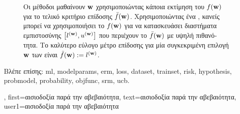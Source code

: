 {{\begin{figure}[H]
\begin{center}
{
\caption{\foreignlanguage{greek}{Οι μέθοδοι}  \foreignlanguage{greek}{μαθαίνουν}  ${\bf w}$ 
	\foreignlanguage{greek}{χρησιμοποιώντας κάποια εκτίμηση του $f({\bf w})$ για το τελικό κριτήριο
	επίδοσης $\bar{f}({\bf w})$. Χρησιμοποιώντας ένα} , \foreignlanguage{greek}{κανείς μπορεί να 
	χρησιμοποιήσει το $f({\bf w})$ για να κατασκευάσει διαστήματα εμπιστοσύνης 
	$\big[ l^{({\bf w})},  u^{({\bf w})} \big]$ που περιέχουν το $\bar{f}({\bf w})$  
	με υψηλή πιθανότητα. Το καλύτερο εύλογο μέτρο επίδοσης για μία συγκεκριμένη επιλογή ${\bf w}$ των}  
	\foreignlanguage{greek}{είναι} $\tilde{f}({\bf w}) := l^{({\bf w})}$.} }
	\end{center}
		\end{figure}
	\foreignlanguage{greek}{Βλέπε επίσης:} \gls{ml}, \gls{modelparams}, \gls{erm}, \gls{loss}, \gls{dataset}, \gls{trainset}, \gls{risk}, \gls{hypothesis}, \gls{probmodel}, \gls{probability}, \gls{objfunc}, \gls{srm}, \gls{ucb}.},
	first={\foreignlanguage{greek}{αισιοδοξία παρά την αβεβαιότητα}},
	text={\foreignlanguage{greek}{αισιοδοξία παρά την αβεβαιότητα}},
	user1={\foreignlanguage{greek}{αισιοδοξία παρά την αβεβαιότητα}} %
}

